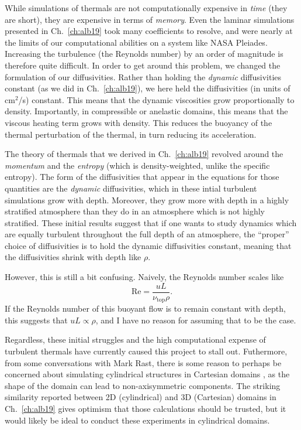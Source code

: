 While simulations of thermals are not computationally expensive in \emph{time} (they are short), they are expensive in terms of \emph{memory}.
Even the laminar simulations presented in Ch.~\ref{ch:alb19} took many coefficients to resolve, and were nearly at the limits of our computational abilities on a system like NASA Pleiades.
Increasing the turbulence (the Reynolds number) by an order of magnitude is therefore quite difficult.
In order to get around this problem, we changed the formulation of our diffusivities.
Rather than holding the \emph{dynamic} diffusivities constant (as we did in Ch.~\ref{ch:alb19}), we here held the diffusivities (in units of cm$^2$/s) constant.
This means that the dynamic viscosities grow proportionally to density.
Importantly, in compressible or anelastic domains, this means that the viscous heating term grows with density.
This reduces the buoyancy of the thermal perturbation of the thermal, in turn reducing its acceleration.

The theory of thermals that we derived in Ch.~\ref{ch:alb19} revolved around the \emph{momentum} and the \emph{entropy} (which is density-weighted, unlike the specific entropy).
The form of the diffusivities that appear in the equations for those quantities are the \emph{dynamic} diffusivities, which in these intial turbulent simulations grow with depth.
Moreover, they grow more with depth in a highly stratified atmosphere than they do in an atmosphere which is not highly stratified.
These initial results suggest that if one wants to study dynamics which are equally turbulent throughout the full depth of an atmosphere, the ``proper'' choice of diffusivities is to hold the dynamic diffusivities constant, meaning that the diffusivities shrink with depth like $\rho$.

However, this is still a bit confusing.
Naively, the Reynolds number scales like
\begin{equation}
\text{Re} = \frac{u L}{\nu_{\text{top}}\rho}.
\end{equation}
If the Reynolds number of this buoyant flow is to remain constant with depth, this suggests that $uL \propto \rho$, and I have no reason for assuming that to be the case.

Regardless, these initial struggles and the high computational expense of turbulent thermals have currently caused this project to stall out.
Futhermore, from some conversations with Mark Rast, there is some reason to perhaps be concerned about simulating cylindrical structures in Cartesian domains \citep[see e.g., Fig.~9 of][]{clyne&all2007}, as the shape of the domain can lead to non-axisymmetric components.
The striking similarity reported between 2D (cylindrical) and 3D (Cartesian) domains in Ch.~\ref{ch:alb19} gives optimism that those calculations should be trusted, but it would likely be ideal to conduct these experiments in cylindrical domains.


